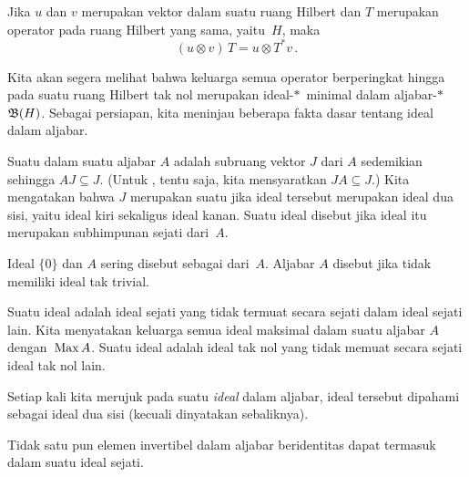 \begin{prop}\label{prop_op_act_otimes2} Jika $u$ dan $v$ merupakan vektor dalam suatu ruang Hilbert dan $T$ merupakan operator pada ruang Hilbert yang sama, yaitu~$H$, maka
   \[ (u \otimes v)\,T = u \otimes T^*v\,. \]
\end{prop}

Kita akan segera melihat bahwa keluarga semua operator berperingkat hingga pada suatu ruang Hilbert tak nol merupakan ideal-$*\,$ minimal dalam
aljabar-$*\,$ $\mathfrak{B}(H)$. Sebagai persiapan, kita meninjau beberapa fakta dasar tentang ideal dalam aljabar.

\begin{defn}\label{000551} Suatu
 dalam suatu aljabar $A$ adalah subruang vektor $J$ dari $A$ sedemikian sehingga $AJ \subseteq J$. (Untuk
, tentu saja, kita mensyaratkan $JA \subseteq J$.) Kita mengatakan bahwa $J$ merupakan suatu
 jika ideal tersebut merupakan ideal dua sisi, yaitu ideal kiri sekaligus ideal kanan. Suatu ideal disebut
 jika ideal itu merupakan subhimpunan sejati dari~$A$.

Ideal $\{0\}$ dan $A$ sering disebut sebagai
 dari~$A$. Aljabar $A$ disebut
 jika tidak memiliki ideal tak trivial.

Suatu
ideal  adalah ideal sejati yang tidak termuat secara sejati dalam ideal sejati lain.
Kita menyatakan keluarga semua ideal maksimal dalam suatu aljabar $A$
dengan~$\operatorname{Max} A$. Suatu
ideal  adalah ideal tak nol yang tidak memuat secara sejati ideal tak nol lain.
\end{defn}

\begin{conv} Setiap kali kita merujuk pada suatu \emph{ideal} dalam aljabar, ideal tersebut dipahami sebagai
ideal dua sisi (kecuali dinyatakan sebaliknya).
\end{conv}

\begin{prop} Tidak satu pun elemen invertibel dalam aljabar beridentitas dapat termasuk dalam suatu ideal sejati.
\end{prop}

